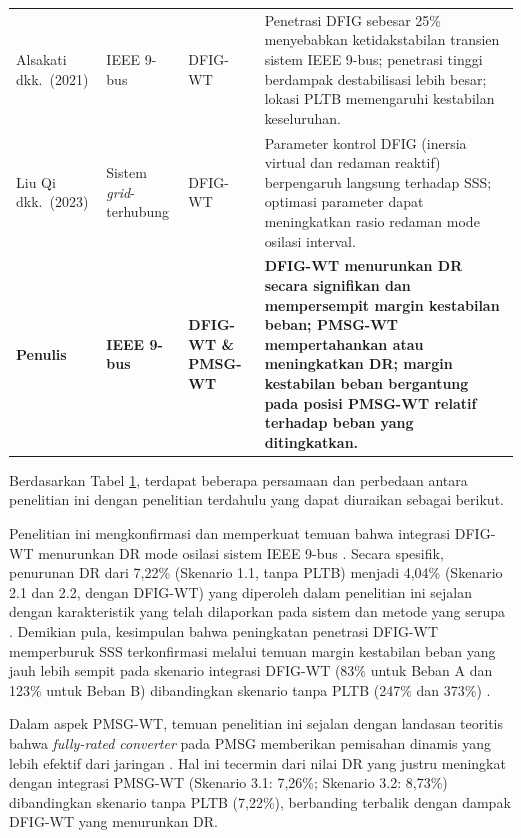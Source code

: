 \begin{table}[H]
\begin{tabularx}{\linewidth}{p{2.8cm} p{1.9cm} p{1.9cm} X}
		\addlinespace
		Alsakati dkk.\ (2021) \cite{alsakati2021} &
		IEEE 9-bus &
		DFIG-WT &
		Penetrasi DFIG sebesar 25\% menyebabkan ketidakstabilan transien sistem IEEE 9-bus; penetrasi tinggi berdampak destabilisasi lebih besar; lokasi PLTB memengaruhi kestabilan keseluruhan. \\
		\addlinespace
		Liu Qi dkk.\ (2023) \cite{liuqi2023} &
		Sistem \textit{grid}-terhubung &
		DFIG-WT &
		Parameter kontrol DFIG (inersia virtual dan redaman reaktif) berpengaruh langsung terhadap SSS; optimasi parameter dapat meningkatkan rasio redaman mode osilasi interval. \\
		\addlinespace
		\textbf{Penulis} &
		\textbf{IEEE 9-bus} &
		\textbf{DFIG-WT \& PMSG-WT} &
		\textbf{DFIG-WT menurunkan DR secara signifikan dan mempersempit margin kestabilan beban; PMSG-WT mempertahankan atau meningkatkan DR; margin kestabilan beban bergantung pada posisi PMSG-WT relatif terhadap beban yang ditingkatkan.} \\
		\bottomrule
	\end{tabularx}
	\label{tab:perbandingan_terdahulu}
\end{table}

Berdasarkan Tabel \ref{tab:perbandingan_terdahulu}, terdapat beberapa persamaan
dan perbedaan antara penelitian ini dengan penelitian terdahulu yang dapat
diuraikan sebagai berikut.

Penelitian ini mengkonfirmasi dan memperkuat temuan bahwa integrasi DFIG-WT
menurunkan DR mode osilasi sistem IEEE 9-bus \cite{mehta2014}. Secara spesifik,
penurunan DR dari 7,22\% (Skenario 1.1, tanpa PLTB) menjadi 4,04\% (Skenario
2.1 dan 2.2, dengan DFIG-WT) yang diperoleh dalam penelitian ini sejalan dengan
karakteristik yang telah dilaporkan pada sistem dan metode yang serupa
\cite{mehta2014}. Demikian pula, kesimpulan bahwa peningkatan penetrasi DFIG-WT
memperburuk SSS terkonfirmasi melalui temuan margin kestabilan beban yang jauh
lebih sempit pada skenario integrasi DFIG-WT (83\% untuk Beban A dan 123\% untuk
Beban B) dibandingkan skenario tanpa PLTB (247\% dan 373\%) \cite{gautam2009impact}.

Dalam aspek PMSG-WT, temuan penelitian ini sejalan dengan landasan teoritis bahwa
\textit{fully-rated converter} pada PMSG memberikan pemisahan dinamis yang lebih
efektif dari jaringan \cite{wu2009small}. Hal ini tecermin dari nilai DR yang
justru meningkat dengan integrasi PMSG-WT (Skenario 3.1: 7,26\%; Skenario 3.2:
8,73\%) dibandingkan skenario tanpa PLTB (7,22\%), berbanding terbalik dengan
dampak DFIG-WT yang menurunkan DR.

